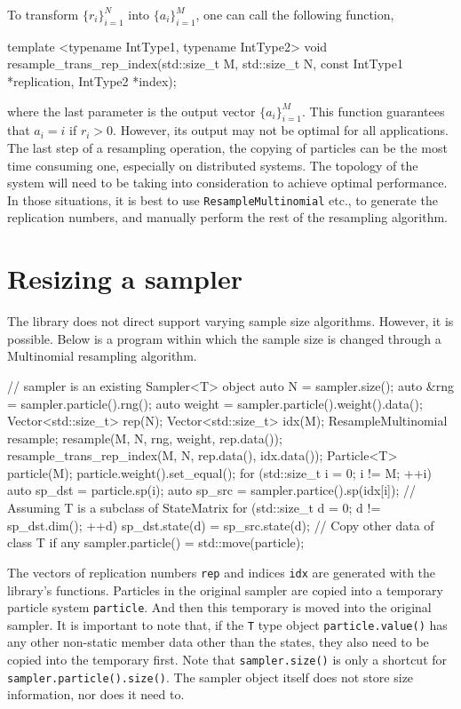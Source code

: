 To transform $\{r_i\}_{i=1}^N$ into $\{a_i\}_{i=1}^M$, one can call the
following function,
\begin{cppcode}
  template <typename IntType1, typename IntType2>
  void resample_trans_rep_index(std::size_t M, std::size_t N,
      const IntType1 *replication, IntType2 *index);
\end{cppcode}
where the last parameter is the output vector $\{a_i\}_{i=1}^M$. This function
guarantees that $a_i = i$ if $r_i > 0$. However, its output may not be optimal
for all applications. The last step of a resampling operation, the copying of
particles can be the most time consuming one, especially on distributed
systems. The topology of the system will need to be taking into consideration
to achieve optimal performance. In those situations, it is best to use
\verb|ResampleMultinomial| etc., to generate the replication numbers, and
manually perform the rest of the resampling algorithm.

\section{Resizing a sampler}
\label{sec:Resizing a sampler}

The library does not direct support varying sample size algorithms. However, it
is possible. Below is a program within which the sample size is changed through
a Multinomial resampling algorithm.
\begin{cppcode}
  // sampler is an existing Sampler<T> object
  auto N = sampler.size();
  auto &rng = sampler.particle().rng();
  auto weight = sampler.particle().weight().data();
  Vector<std::size_t> rep(N);
  Vector<std::size_t> idx(M);
  ResampleMultinomial resample;
  resample(M, N, rng, weight, rep.data());
  resample_trans_rep_index(M, N, rep.data(), idx.data());
  Particle<T> particle(M);
  particle.weight().set_equal();
  for (std::size_t i = 0; i != M; ++i) {
      auto sp_dst = particle.sp(i);
      auto sp_src = sampler.partice().sp(idx[i]);
      // Assuming T is a subclass of StateMatrix
      for (std::size_t d = 0; d != sp_dst.dim(); ++d)
          sp_dst.state(d) = sp_src.state(d);
  }
  // Copy other data of class T if any
  sampler.particle() = std::move(particle);
\end{cppcode}
The vectors of replication numbers \verb|rep| and indices \verb|idx| are
generated with the library's functions. Particles in the original sampler are
copied into a temporary particle system \verb|particle|. And then this
temporary is moved into the original sampler. It is important to note that, if
the \verb|T| type object \verb|particle.value()| has any other non-static
member data other than the states, they also need to be copied into the
temporary first. Note that \verb|sampler.size()| is only a shortcut for
\verb|sampler.particle().size()|. The sampler object itself does not store size
information, nor does it need to.
